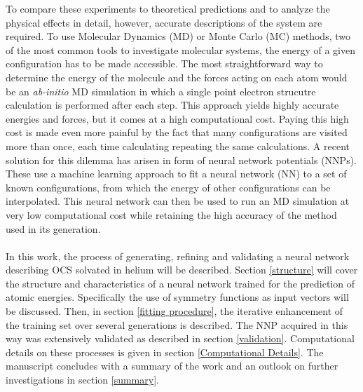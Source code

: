 \documentclass[12pt,titlepage]{article}
\begin{document}
To compare these experiments to theoretical predictions and to analyze the physical effects in detail, however, accurate descriptions of the system are required. To use Molecular Dynamics (MD) or Monte Carlo (MC) methods, two of the most common tools to investigate molecular systems, the energy of a given configuration has to be made accessible.{\tiny } The most straightforward way to determine the energy of the molecule and the forces acting on each atom would be an \textit{ab-initio} MD simulation in which a single point electron strucutre calculation is performed after each step. This approach yields highly accurate energies and forces, but it comes at a high computational cost. Paying this high cost is made even more painful by the fact that many configurations are visited more than once, each time calculating repeating the same calculations. A recent solution for this dilemma has arisen in form of neural network potentials (NNPs). These use a machine learning approach to fit a neural network (NN) to a set of known configurations, from which the energy of other configurations can be interpolated. This neural network can then be used to run an MD simulation at very low computational cost while retaining the high accuracy of the method used in its generation.  
\\
\\
In this work, the process of generating, refining and validating a neural network describing OCS solvated in helium will be described. Section \ref{structure} will cover the structure and characteristics of a neural network trained for the prediction of atomic energies. Specifically the use of symmetry functions as input vectors will be discussed.
Then, in section \ref{fitting procedure}, the iterative enhancement of the training set over several generations is described. The NNP acquired in this way was extensively validated as described in section \ref{validation}. Computational details on these processes is given in section \ref{Computational Details}. The manuscript concludes with a summary of the work and an outlook on further investigations in section \ref{summary}. 
\end{document}
